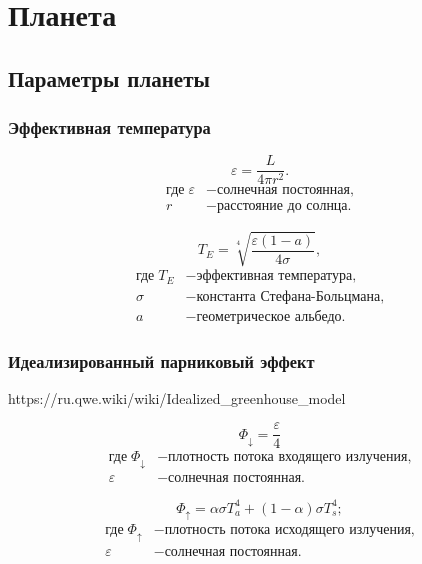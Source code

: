 \section{Планета}

\subsection{Параметры планеты}

\subsubsection{Эффективная температура}
\begin{equation}
	\varepsilon = \frac{L}{4\pi r^2}.
\end{equation}
\begin{align*}
	\text{где}\;  
	\varepsilon & - \text{солнечная постоянная,}\\
	r & - \text{расстояние до солнца.}
\end{align*}

\begin{equation}
	T_E = \sqrt[4]{\frac{\varepsilon \left( 1- a \right) }{4\sigma}},
\end{equation}
\begin{align*}
	\text{где}\;  
	T_E & - \text{эффективная температура,}\\
	\sigma & - \text{константа Стефана-Больцмана,}\\
	a & - \text{геометрическое альбедо.}
\end{align*}

\subsubsection{Идеализированный парниковый эффект}
https://ru.qwe.wiki/wiki/Idealized\_greenhouse\_model

\begin{equation}
	\Phi_\downarrow = \frac{\varepsilon}{4}
\end{equation}
\begin{align*}
	\text{где}\;  
	\Phi_\downarrow & - \text{плотность потока входящего излучения,}\\
	\varepsilon & - \text{солнечная постоянная.}
\end{align*}

\begin{equation}
	\Phi_\uparrow = \alpha \sigma T_a^4 + (1-\alpha)\sigma T_s^4;
\end{equation}
\begin{align*}
	\text{где}\;  
	\Phi_\uparrow & - \text{плотность потока исходящего излучения,}\\
	\varepsilon & - \text{солнечная постоянная.}
\end{align*}

